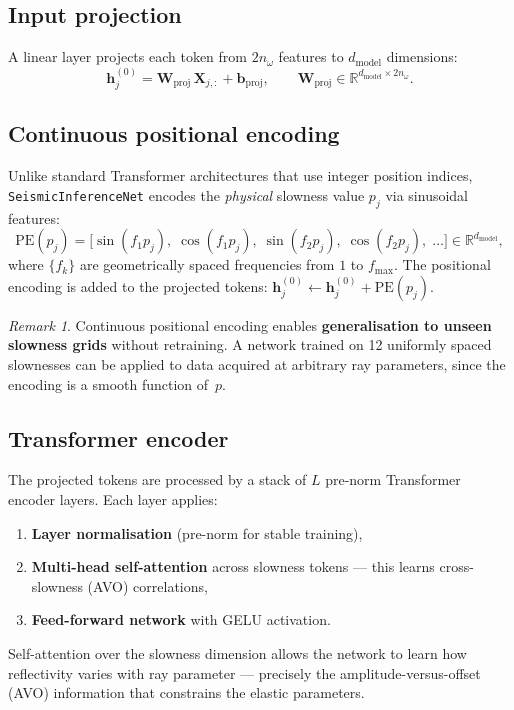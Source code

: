 \documentclass[11pt,a4paper]{article}
\theoremstyle{plain}
\theoremstyle{remark}
\newtheorem{remark}{Remark}
\begin{document}
\subsection{Input projection}

A linear layer projects each token from $2n_\omega$ features to
$d_{\text{model}}$ dimensions:
\begin{equation}\label{eq:input-proj}
  \mathbf{h}_j^{(0)}
  = \mathbf{W}_{\text{proj}}\,\mathbf{X}_{j,:} + \mathbf{b}_{\text{proj}},
  \qquad
  \mathbf{W}_{\text{proj}} \in \mathbb{R}^{d_{\text{model}} \times 2n_\omega}.
\end{equation}

\subsection{Continuous positional encoding}

Unlike standard Transformer architectures that use integer position
indices, \texttt{SeismicInferenceNet} encodes the \emph{physical}
slowness value $p_j$ via sinusoidal features:
\begin{equation}\label{eq:pos-enc}
  \text{PE}(p_j)
  = \bigl[\sin(f_1 p_j),\; \cos(f_1 p_j),\;
          \sin(f_2 p_j),\; \cos(f_2 p_j),\;
          \dotsc\bigr]
  \in \mathbb{R}^{d_{\text{model}}},
\end{equation}
where $\{f_k\}$ are geometrically spaced frequencies from $1$ to
$f_{\max}$.  The positional encoding is added to the projected tokens:
$\mathbf{h}_j^{(0)} \leftarrow \mathbf{h}_j^{(0)} + \text{PE}(p_j)$.

\begin{remark}
Continuous positional encoding enables \textbf{generalisation to unseen
slowness grids} without retraining.  A network trained on 12 uniformly
spaced slownesses can be applied to data acquired at arbitrary ray
parameters, since the encoding is a smooth function of~$p$.
\end{remark}

\subsection{Transformer encoder}

The projected tokens are processed by a stack of $L$ pre-norm
Transformer encoder layers.  Each layer applies:
\begin{enumerate}[nosep]
  \item \textbf{Layer normalisation} (pre-norm for stable training),
  \item \textbf{Multi-head self-attention} across slowness tokens ---
    this learns cross-slowness (AVO) correlations,
  \item \textbf{Feed-forward network} with GELU activation.
\end{enumerate}
Self-attention over the slowness dimension allows the network to learn
how reflectivity varies with ray parameter --- precisely the
amplitude-versus-offset (AVO) information that constrains the elastic
parameters.
\end{document}
